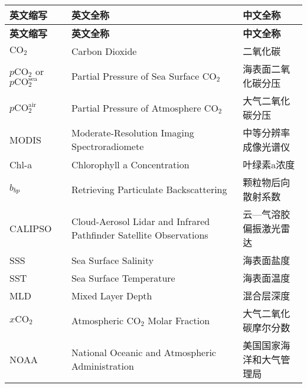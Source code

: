 \cleardoublepage
\begin{center}
    \begin{longtable}{m{3cm}<{\centering}m{7cm}<{\centering}m{5cm}<{\centering}} 
        \toprule
        \textbf{英文缩写}&\textbf{英文全称}&\textbf{中文全称}\\
        \midrule
        \endfirsthead
        \toprule
        \textbf{英文缩写}&\textbf{英文全称}&\textbf{中文全称}\\
        \midrule
        \endhead 
        \bottomrule
        \endfoot
        \bottomrule
        \endlastfoot
        $\mathrm{CO_2}$                                   & Carbon Dioxide                                  & 二氧化碳\\
        $p\mathrm{CO_2}$ or $p\mathrm{CO_2^{sea}}$        &Partial Pressure of Sea Surface $\mathrm{CO_2}$              &海表面二氧化碳分压\\
        $p\mathrm{CO_2^{air}}$                            &Partial Pressure of Atmosphere $\mathrm{CO_2}$               & 大气二氧化碳分压\\
        MODIS                                             &Moderate-Resolution Imaging Spectroradiomete     &中等分辨率成像光谱仪 \\
        Chl-a                                             &Chlorophyll a Concentration                       &叶绿素a浓度\\
        $b_{bp}$                                        & Retrieving Particulate Backscattering            &颗粒物后向散射系数\\
        CALIPSO                                           &Cloud-Aerosol Lidar and Infrared Pathfinder Satellite Observations                          
                                                                                                            &云—气溶胶偏振激光雷达\\
        SSS                                              &Sea Surface Salinity                              &海表面盐度\\
        SST                                              &Sea Surface Temperature                           &海表面温度\\
        MLD                                              &Mixed Layer Depth                                 &混合层深度\\
        $x\mathrm{CO_2}$                                 &Atmospheric $\mathrm{CO_2}$ Molar Fraction        &大气二氧化碳摩尔分数\\
        NOAA                                             &National Oceanic and Atmospheric Administration   &美国国家海洋和大气管理局\\
        

\end{longtable}
\end{center}
